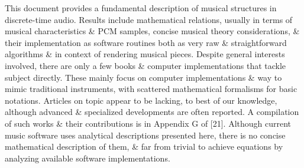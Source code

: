 \documentclass{article}
\begin{document}
\begin{itemize}
	This document provides a fundamental description of musical structures in discrete-time audio. Results include mathematical relations, usually in terms of musical characteristics \& PCM samples, concise musical theory considerations, \& their implementation as software routines both as very raw \& straightforward algorithms \& in context of rendering musical pieces. Despite general interests involved, there are only a few books \& computer implementations that tackle subject directly. These mainly focus on computer implementations \& way to mimic traditional instruments, with scattered mathematical formalisms for basic notations. Articles on topic appear to be lacking, to best of our knowledge, although advanced \& specialized developments are often reported. A compilation of such works \& their contributions is in Appendix G of [21]. Although current music software uses analytical descriptions presented here, there is no concise mathematical description of them, \& far from trivial to achieve equations by analyzing available software implementations.
	

\end{itemize}
\end{document}
